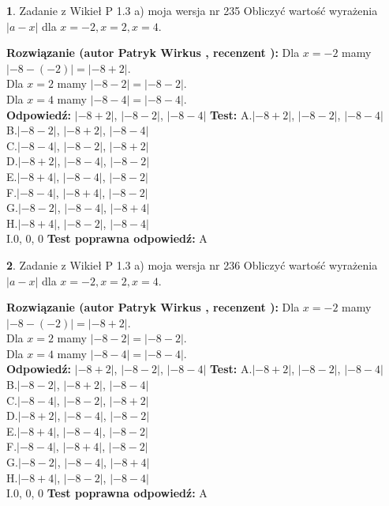 \documentclass[12pt, a4paper]{article}
\theoremstyle{definition} %
\newtheorem{zad}{}
\newcommand{\zadStart}[1]{\begin{zad}#1\newline}
\newcommand{\zadStop}{\end{zad}}
\newcommand{\rozwStart}[2]{\noindent \textbf{Rozwiązanie (autor #1 , recenzent #2): }\newline}
\newcommand{\rozwStop}{\newline}
\newcommand{\odpStart}{\noindent \textbf{Odpowiedź:}\newline}
\newcommand{\odpStop}{\newline}
\newcommand{\testStart}{\noindent \textbf{Test:}\newline}
\newcommand{\testStop}{\newline}
\newcommand{\kluczStart}{\noindent \textbf{Test poprawna odpowiedź:}\newline}
\newcommand{\kluczStop}{\newline}
\begin{document}
\zadStart{Zadanie z Wikieł P 1.3 a) moja wersja nr 235}
Obliczyć wartość wyrażenia $|a - x|$ dla $x=-2,x=2,x=4$.
\zadStop
\rozwStart{Patryk Wirkus}{}
Dla $x = -2$ mamy $|-8 - (-2)| = |-8 + 2|$.\\
Dla $x = 2$ mamy $|-8 - 2| = |-8 - 2|$.\\
Dla $x = 4$ mamy $|-8 - 4| = |-8 - 4|$.\\
\rozwStop
\odpStart
$|-8 + 2|$, $|-8 - 2|$, $|-8 - 4|$
\odpStop
\testStart
A.$|-8 + 2|$, $|-8 - 2|$, $|-8 - 4|$\\
B.$|-8 - 2|$, $|-8 + 2|$, $|-8 - 4|$\\
C.$|-8 - 4|$, $|-8 - 2|$, $|-8 + 2|$\\
D.$|-8 + 2|$, $|-8 - 4|$, $|-8 - 2|$\\
E.$|-8 + 4|$, $|-8 - 4|$, $|-8 - 2|$\\
F.$|-8 - 4|$, $|-8 + 4|$, $|-8 - 2|$\\
G.$|-8 - 2|$, $|-8 - 4|$, $|-8 + 4|$\\
H.$|-8 + 4|$, $|-8 - 2|$, $|-8 - 4|$\\
I.$0$, $0$, $0$
\testStop
\kluczStart
A
\kluczStop



\zadStart{Zadanie z Wikieł P 1.3 a) moja wersja nr 236}
Obliczyć wartość wyrażenia $|a - x|$ dla $x=-2,x=2,x=4$.
\zadStop
\rozwStart{Patryk Wirkus}{}
Dla $x = -2$ mamy $|-8 - (-2)| = |-8 + 2|$.\\
Dla $x = 2$ mamy $|-8 - 2| = |-8 - 2|$.\\
Dla $x = 4$ mamy $|-8 - 4| = |-8 - 4|$.\\
\rozwStop
\odpStart
$|-8 + 2|$, $|-8 - 2|$, $|-8 - 4|$
\odpStop
\testStart
A.$|-8 + 2|$, $|-8 - 2|$, $|-8 - 4|$\\
B.$|-8 - 2|$, $|-8 + 2|$, $|-8 - 4|$\\
C.$|-8 - 4|$, $|-8 - 2|$, $|-8 + 2|$\\
D.$|-8 + 2|$, $|-8 - 4|$, $|-8 - 2|$\\
E.$|-8 + 4|$, $|-8 - 4|$, $|-8 - 2|$\\
F.$|-8 - 4|$, $|-8 + 4|$, $|-8 - 2|$\\
G.$|-8 - 2|$, $|-8 - 4|$, $|-8 + 4|$\\
H.$|-8 + 4|$, $|-8 - 2|$, $|-8 - 4|$\\
I.$0$, $0$, $0$
\testStop
\kluczStart
A
\kluczStop
\end{document}
